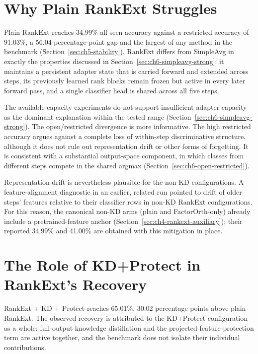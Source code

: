 \section{Why Plain RankExt Struggles}
\label{sec:ch6-rankext-struggles}

Plain RankExt reaches 34.99\% all-seen accuracy against a restricted
accuracy of 91.03\%, a 56.04-percentage-point gap and the largest of any
method in the benchmark (Section~\ref{sec:ch5-stability}). RankExt differs
from SimpleAvg in exactly the properties discussed in
Section~\ref{sec:ch6-simpleavg-strong}: it maintains a persistent adapter
state that is carried forward and extended across steps, its previously
learned rank blocks remain frozen but active in every later forward pass,
and a single classifier head is shared across all five steps.

The available capacity experiments do not support insufficient adapter
capacity as the dominant explanation within the tested range
(Section~\ref{sec:ch6-simpleavg-strong}). The open/restricted divergence is
more informative. The high restricted accuracy argues against a complete
loss of within-step discriminative structure, although it does not rule out
representation drift or other forms of forgetting. It is consistent with a
substantial output-space component, in which classes from different steps
compete in the shared argmax (Section~\ref{sec:ch6-open-restricted}).

Representation drift is nevertheless plausible for the non-KD
configurations. A feature-alignment diagnostic in an earlier, related run
pointed to drift of older steps' features relative to their classifier rows
in non-KD RankExt configurations. For this reason, the canonical non-KD arms
(plain and FactorOrth-only) already include a pretrained-feature anchor
(Section~\ref{sec:ch4-rankext-auxiliary}); their reported 34.99\% and
41.00\% are obtained with this mitigation in place.

\section{The Role of KD+Protect in RankExt's Recovery}
\label{sec:ch6-kd-protect}

RankExt + KD + Protect reaches 65.01\%, 30.02 percentage points above plain
RankExt. The observed recovery is attributed to the KD+Protect configuration
as a whole: full-output knowledge distillation and the projected
feature-protection term are active together, and the benchmark does not
isolate their individual contributions.

